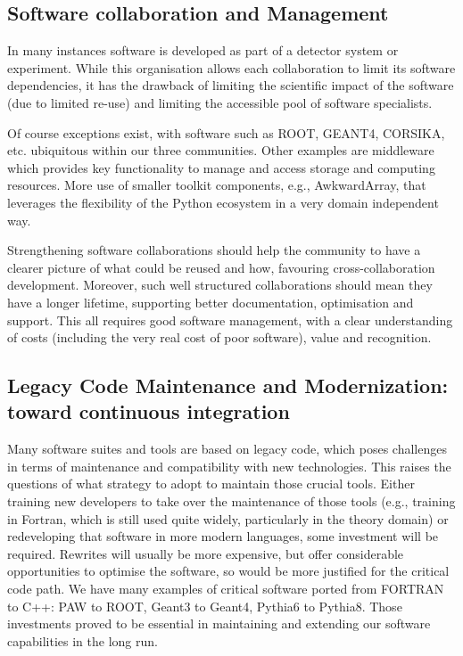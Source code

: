 \subsection{Software collaboration and Management}


In many instances software is developed as part of a detector system or experiment. While this organisation allows each collaboration to limit its software dependencies, it has the drawback of limiting the scientific impact of the software (due to limited re-use) and limiting the accessible pool of software specialists.

Of course exceptions exist, with software such as ROOT, GEANT4, CORSIKA, etc. ubiquitous within our three communities. Other examples are middleware which provides key functionality to manage and access storage and computing resources. More use of smaller toolkit components, e.g., AwkwardArray, that leverages the flexibility of the Python ecosystem in a very domain independent way.

Strengthening software collaborations should help the community to have a clearer picture of what could be reused and how, favouring cross-collaboration development. Moreover, such well structured collaborations should mean they have a longer lifetime, supporting better documentation, optimisation and support. This all requires good software management, with a clear understanding of costs (including the very real cost of poor software), value and recognition.


\subsection{Legacy Code Maintenance and Modernization: toward continuous integration}

Many software suites and tools are based on legacy code, which poses challenges in terms of maintenance and compatibility with new technologies. This raises the questions of what strategy to adopt to maintain those crucial tools. Either training new developers to take over the maintenance of those tools (e.g., training in Fortran, which is still used quite widely, particularly in the theory domain) or redeveloping that software in more modern languages, some investment will be required. Rewrites will usually be more expensive, but offer considerable opportunities to optimise the software, so would be more justified for the critical code path. We have many examples of critical software ported from FORTRAN to C++: PAW to ROOT, Geant3 to Geant4, Pythia6 to Pythia8. Those investments proved to be essential in maintaining and extending our software capabilities in the long run.

